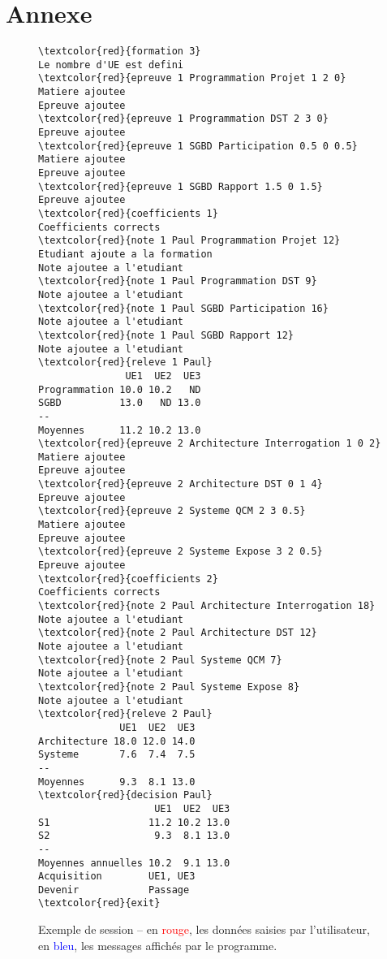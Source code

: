 \documentclass[10pt,a4paper,oneside]{article}
\begin{document}
\section*{Annexe}
\begin{center}
\begin{figure*}[ht]
\setlength{\columnseprule}{.25mm}
\setlength{\columnsep}{15.mm}
\begin{multicols}{2}
\color{blue}
\begin{Verbatim}[commandchars=\\\{\}]
\textcolor{red}{formation 3}
Le nombre d'UE est defini
\textcolor{red}{epreuve 1 Programmation Projet 1 2 0}
Matiere ajoutee
Epreuve ajoutee
\textcolor{red}{epreuve 1 Programmation DST 2 3 0}
Epreuve ajoutee
\textcolor{red}{epreuve 1 SGBD Participation 0.5 0 0.5}
Matiere ajoutee
Epreuve ajoutee
\textcolor{red}{epreuve 1 SGBD Rapport 1.5 0 1.5}
Epreuve ajoutee
\textcolor{red}{coefficients 1}
Coefficients corrects
\textcolor{red}{note 1 Paul Programmation Projet 12}
Etudiant ajoute a la formation 
Note ajoutee a l'etudiant
\textcolor{red}{note 1 Paul Programmation DST 9}
Note ajoutee a l'etudiant
\textcolor{red}{note 1 Paul SGBD Participation 16}
Note ajoutee a l'etudiant
\textcolor{red}{note 1 Paul SGBD Rapport 12}
Note ajoutee a l'etudiant
\textcolor{red}{releve 1 Paul}
               UE1  UE2  UE3
Programmation 10.0 10.2   ND
SGBD          13.0   ND 13.0
--
Moyennes      11.2 10.2 13.0
\textcolor{red}{epreuve 2 Architecture Interrogation 1 0 2}
Matiere ajoutee
Epreuve ajoutee
\textcolor{red}{epreuve 2 Architecture DST 0 1 4}
Epreuve ajoutee
\textcolor{red}{epreuve 2 Systeme QCM 2 3 0.5}
Matiere ajoutee
Epreuve ajoutee
\textcolor{red}{epreuve 2 Systeme Expose 3 2 0.5}
Epreuve ajoutee
\textcolor{red}{coefficients 2}
Coefficients corrects
\textcolor{red}{note 2 Paul Architecture Interrogation 18}
Note ajoutee a l'etudiant
\textcolor{red}{note 2 Paul Architecture DST 12}
Note ajoutee a l'etudiant
\textcolor{red}{note 2 Paul Systeme QCM 7}
Note ajoutee a l'etudiant
\textcolor{red}{note 2 Paul Systeme Expose 8}
Note ajoutee a l'etudiant
\textcolor{red}{releve 2 Paul}
              UE1  UE2  UE3
Architecture 18.0 12.0 14.0
Systeme       7.6  7.4  7.5
--
Moyennes      9.3  8.1 13.0
\textcolor{red}{decision Paul}
                    UE1  UE2  UE3
S1                 11.2 10.2 13.0
S2                  9.3  8.1 13.0
--
Moyennes annuelles 10.2  9.1 13.0
Acquisition        UE1, UE3
Devenir            Passage
\textcolor{red}{exit}
\end{Verbatim}
\end{multicols}
	\caption{Exemple de session -- en \textcolor{red}{rouge}, les données saisies par l'utilisateur, en \textcolor{blue}{bleu}, les messages affichés par le programme.}
	\label{fig:session}
\end{figure*}
\end{center}
\end{document}
